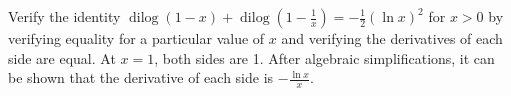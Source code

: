 {\label{dilog3}Verify the identity $\operatorname{dilog}(1-x)+\operatorname{dilog}\left(1-\frac{1}{x}\right)=-\frac{1}{2}(\ln x)^2$ for $x>0$ by verifying equality for a particular value of $x$ and verifying the derivatives of each side are equal.
}
{At $x=1$, both sides are 1.  After algebraic simplifications, it can be shown that the derivative of each side is $-\frac{\ln x}{x}$.
}